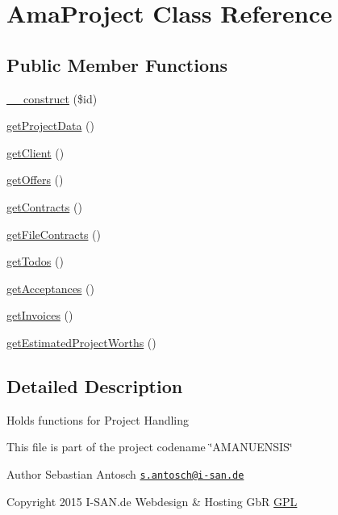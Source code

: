 \hypertarget{a00008}{}\section{Ama\+Project Class Reference}
\label{a00008}
\subsection*{Public Member Functions}
\begin{DoxyCompactItemize}
\item 
\hyperlink{a00008_a1340871f436b81e1f225567b6cce4e79}{\+\_\+\+\_\+construct} (\$id)
\item 
\hyperlink{a00008_a6e71e26a77f2e326be9dcb413d57cd56}{get\+Project\+Data} ()
\item 
\hyperlink{a00008_a2f5f44fdf5404c87cc3a7b5719d85306}{get\+Client} ()
\item 
\hyperlink{a00008_ad6b923f827d8f3110f54e6a251365259}{get\+Offers} ()
\item 
\hyperlink{a00008_a1edd4b9b688a04f254580507f0652787}{get\+Contracts} ()
\item 
\hyperlink{a00008_aa3ed1126f760cf244edcda9ccc9ed698}{get\+File\+Contracts} ()
\item 
\hyperlink{a00008_a570b08ed9f427887c6a41dc854531fed}{get\+Todos} ()
\item 
\hyperlink{a00008_a33dfa2e005957d6b91becb1024a8ae42}{get\+Acceptances} ()
\item 
\hyperlink{a00008_a4a18c0abbf6628848d2c3b8c48fbca19}{get\+Invoices} ()
\item 
\hyperlink{a00008_a9b495aacb8c39681532292be26dac452}{get\+Estimated\+Project\+Worths} ()
\end{DoxyCompactItemize}


\subsection{Detailed Description}
Holds functions for Project Handling

This file is part of the project codename \char`\"{}\+A\+M\+A\+N\+U\+E\+N\+S\+I\+S\char`\"{}

\begin{DoxyAuthor}{Author}
Sebastian Antosch \href{mailto:s.antosch@i-san.de}{\tt s.\+antosch@i-\/san.\+de} 
\end{DoxyAuthor}
\begin{DoxyCopyright}{Copyright}
2015 I-\/\+S\+A\+N.\+de Webdesign \& Hosting Gb\+R \hyperlink{}{G\+P\+L }
\end{DoxyCopyright}


